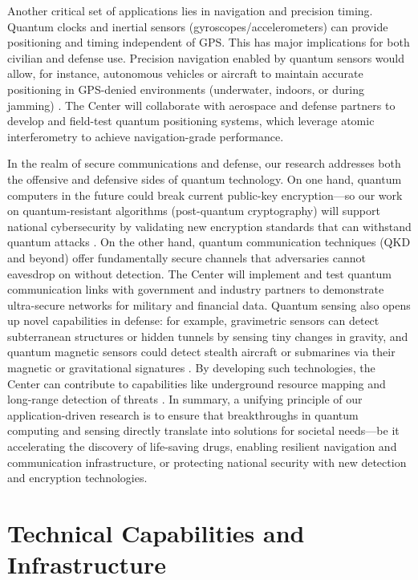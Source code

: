 \documentclass[12pt]{article}
\begin{document}
Another critical set of applications lies in navigation and precision timing. Quantum clocks and inertial sensors (gyroscopes/accelerometers) can provide positioning and timing independent of GPS. This has major implications for both civilian and defense use. Precision navigation enabled by quantum sensors would allow, for instance, autonomous vehicles or aircraft to maintain accurate positioning in GPS-denied environments (underwater, indoors, or during jamming) . The Center will collaborate with aerospace and defense partners to develop and field-test quantum positioning systems, which leverage atomic interferometry to achieve navigation-grade performance.



In the realm of secure communications and defense, our research addresses both the offensive and defensive sides of quantum technology. On one hand, quantum computers in the future could break current public-key encryption—so our work on quantum-resistant algorithms (post-quantum cryptography) will support national cybersecurity by validating new encryption standards that can withstand quantum attacks . On the other hand, quantum communication techniques (QKD and beyond) offer fundamentally secure channels that adversaries cannot eavesdrop on without detection. The Center will implement and test quantum communication links with government and industry partners to demonstrate ultra-secure networks for military and financial data. Quantum sensing also opens up novel capabilities in defense: for example, gravimetric sensors can detect subterranean structures or hidden tunnels by sensing tiny changes in gravity, and quantum magnetic sensors could detect stealth aircraft or submarines via their magnetic or gravitational signatures . By developing such technologies, the Center can contribute to capabilities like underground resource mapping and long-range detection of threats . In summary, a unifying principle of our application-driven research is to ensure that breakthroughs in quantum computing and sensing directly translate into solutions for societal needs—be it accelerating the discovery of life-saving drugs, enabling resilient navigation and communication infrastructure, or protecting national security with new detection and encryption technologies.



\section{Technical Capabilities and Infrastructure}
\end{document}
